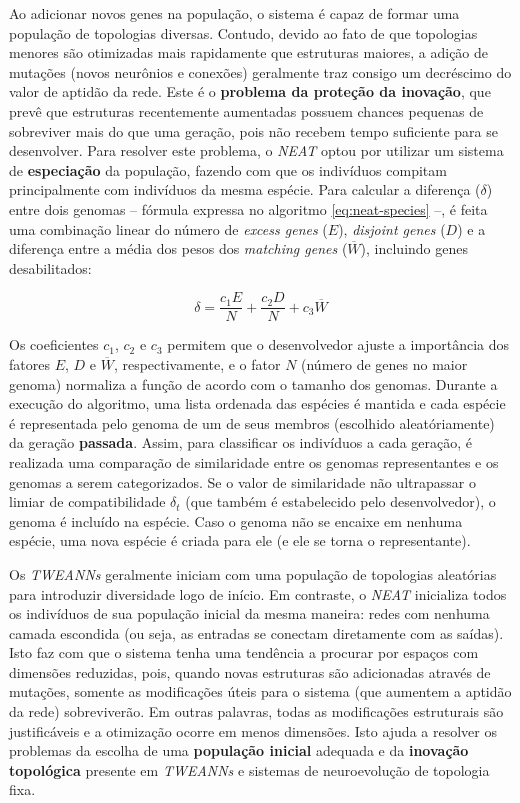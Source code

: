 Ao adicionar novos genes na população, o sistema é capaz de formar uma população
de topologias diversas. Contudo, devido ao fato de que topologias menores são
otimizadas mais rapidamente que estruturas maiores, a adição de mutações (novos
neurônios e conexões) geralmente traz consigo um decréscimo do valor de aptidão
da rede. Este é o \textbf{problema da proteção da inovação}, que prevê que
estruturas recentemente aumentadas possuem chances pequenas de sobreviver mais
do que uma geração, pois não recebem tempo suficiente para se desenvolver. Para
resolver este problema, o \textit{NEAT} optou por utilizar um sistema de
\textbf{especiação} da população, fazendo com que os indivíduos compitam
principalmente com indivíduos da mesma espécie. Para calcular a diferença
($\delta$) entre dois genomas -- fórmula expressa no algoritmo
\ref{eq:neat-species} --, é feita uma combinação linear do número de
\textit{excess genes} ($E$), \textit{disjoint genes} ($D$) e a diferença entre a
média dos pesos dos \textit{matching genes} ($\overline{W}$), incluindo genes
desabilitados:	

\begin{equation}
\label{eq:neat-species}
\delta = \frac{c_1E}{N} + \frac{c_2D}{N} + c_3\overline{W}
\end{equation}

Os coeficientes $c_1$, $c_2$ e $c_3$ permitem que o desenvolvedor ajuste a
importância dos fatores $E$, $D$ e $\overline{W}$, respectivamente, e o fator
$N$ (número de genes no maior genoma) normaliza a função de acordo com o tamanho
dos genomas. Durante a execução do algoritmo, uma lista ordenada das espécies é
mantida e cada espécie é representada pelo genoma de um de seus membros
(escolhido aleatóriamente) da geração \textbf{passada}. Assim, para classificar
os indivíduos a cada geração, é realizada uma comparação de similaridade entre
os genomas representantes e os genomas a serem categorizados. Se o valor de
similaridade não ultrapassar o limiar de compatibilidade $\delta_t$ (que também
é estabelecido pelo desenvolvedor), o genoma é incluído na espécie. Caso o
genoma não se encaixe em nenhuma espécie, uma nova espécie é criada para ele (e
ele se torna o representante).

Os \textit{TWEANNs} geralmente iniciam com uma população de topologias
aleatórias para introduzir diversidade logo de início. Em contraste, o
\textit{NEAT} inicializa todos os indivíduos de sua população inicial da mesma
maneira: redes com nenhuma camada escondida (ou seja, as entradas se conectam
diretamente com as saídas). Isto faz com que o sistema tenha uma tendência a
procurar por espaços com dimensões reduzidas, pois, quando novas estruturas são
adicionadas através de mutações, somente as modificações úteis para o sistema
(que aumentem a aptidão da rede) sobreviverão. Em outras palavras, todas as
modificações estruturais são justificáveis e a otimização ocorre em menos
dimensões. Isto ajuda a resolver os problemas da escolha de uma
\textbf{população inicial} adequada e da \textbf{inovação topológica} presente
em \textit{TWEANNs} e sistemas de neuroevolução de topologia fixa.

